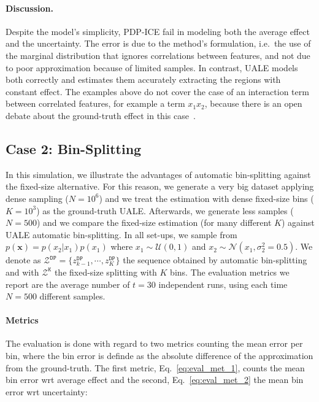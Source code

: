 \documentclass[twoside]{article}
\begin{document}
\paragraph{Discussion.}

Despite the model's simplicity, PDP-ICE fail in modeling both the
average effect and the uncertainty. The error is due to the method's
formulation, i.e.~the use of the marginal distribution that ignores
correlations between features, and not due to poor approximation
because of limited samples. In contrast, UALE models both correctly
and estimates them accurately extracting the regions with constant
effect.  The examples above do not cover the case of an interaction
term between correlated features, for example a term \(x_1x_2\),
because there is an open debate about the ground-truth effect in this
case~\citep{Gromping2020MAEP}.

\subsection{Case 2: Bin-Splitting}
\label{sec:simulation-examples-2}

In this simulation, we illustrate the advantages of automatic
bin-splitting against the fixed-size alternative. For this reason, we
generate a very big dataset applying dense sampling (\(N=10^6\)) and
we treat the estimation with dense fixed-size bins (\(K=10^3\)) as the
ground-truth UALE. Afterwards, we generate less samples (\(N=500\))
and we compare the fixed-size estimation (for many different \(K\))
against UALE automatic bin-splitting. In all set-ups, we sample from
\(p(\mathbf{x}) = p(x_2|x_1)p(x_1)\) where
\(x_1 \sim \mathcal{U}(0,1)\) and
\(x_2 \sim \mathcal{N}(x_1, \sigma_2^2=0.5)\). We denote as
\(\mathcal{Z^{\mathtt{DP}}} = \{z^{\mathtt{DP}}_{k-1}, \cdots,
z^{\mathtt{DP}}_{K}\}\) the sequence obtained by automatic
bin-splitting and with \(\mathcal{Z^{\mathtt{K}}}\) the fixed-size
splitting with \(K\) bins. The evaluation metrics we report are the
average number of \(t = 30\) independent runs, using each time
\(N=500\) different samples.

\paragraph{Metrics}

The evaluation is done with regard to two metrics counting the mean
error per bin, where the bin error is definde as the absolute
difference of the approximation from the ground-truth. The first
metric, Eq.~\eqref{eq:eval_met_1}, counts the mean bin error wrt
average effect and the second, Eq.~\eqref{eq:eval_met_2} the mean bin
error wrt uncertainty:
\end{document}
